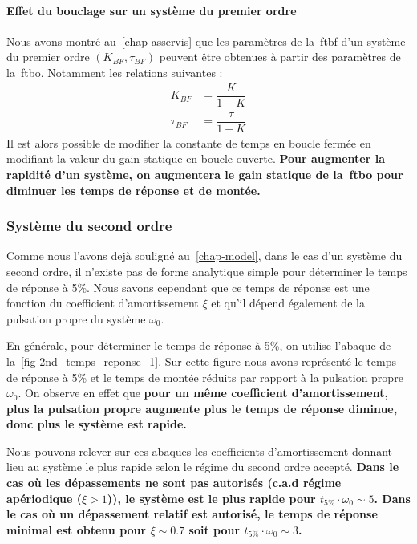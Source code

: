 \paragraph{Effet du bouclage sur un système du premier ordre}
Nous avons montré au~\cref{chap-asservis} que les paramètres de 
la~\gls{ftbf} d'un système du premier ordre $(K_{BF},\tau_{BF})$ peuvent 
être obtenues à partir des paramètres de la~\gls{ftbo}. Notamment les relations
suivantes :
\begin{align*}
       K_{BF}&=\dfrac{K}{1+K}\\
    \tau_{BF}&=\dfrac{\tau}{1+K}
\end{align*}
Il est alors possible de modifier la constante de temps en boucle fermée en 
modifiant la valeur du gain statique en boucle ouverte. \textbf{Pour augmenter
la rapidité d'un système, on augmentera le gain statique de la~\gls{ftbo} pour
diminuer les temps de réponse et de montée.}
\subsubsection{Système du second ordre}
Comme nous l'avons dejà souligné au~\cref{chap-model}, dans le cas d'un système
du second ordre, il n'existe pas de forme analytique simple pour déterminer 
le temps de réponse à 5\%. Nous savons cependant que ce temps de réponse est 
une fonction du coefficient d'amortissement $\xi$ et qu'il dépend également 
de la pulsation propre du système $\omega_0$.

En générale, pour déterminer le temps de réponse à 5\%, on utilise l'abaque de 
la~\cref{fig-2nd_temps_reponse_1}. Sur cette figure nous avons représenté
le temps de réponse à 5\% et le temps de montée réduits par rapport à la
pulsation propre $\omega_0$. On observe en effet que \textbf{pour un même 
coefficient d'amortissement, plus la pulsation propre augmente plus 
le temps de réponse diminue, donc plus le système est rapide.}

Nous pouvons relever sur ces abaques les coefficients d'amortissement donnant
lieu au système le plus rapide selon le régime du second ordre accepté.
\textbf{Dans le cas où les dépassements ne sont pas autorisés (c.a.d régime 
apériodique ($\xi>1$)), le système est le plus rapide pour 
$t_{5\%}\cdot\omega_0\sim5$. Dans le cas où un dépassement relatif est 
autorisé, le temps de réponse minimal est obtenu pour $\xi\sim 0.7$ soit
pour $t_{5\%}\cdot\omega_0\sim3$.}

